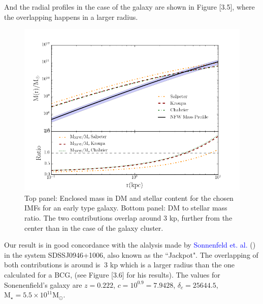 And the radial profiles in the case of the galaxy are shown in Figure [3.5], where the overlapping happens in a larger radius.

\begin{figure}[H]
\centering
\includegraphics[width=12cm]{images/DM_fraction_all_IMFs_galaxy.png}
\caption[DM and Stellar mass profiles for a massive early type galaxy.]{Top panel: Enclosed mass in DM and stellar content for the chosen IMFs for an early type galaxy. Bottom panel: DM to stellar mass ratio. The two contributions overlap around 3 kp, further from the center than in the case of the galaxy cluster.}
\end{figure}

Our result is in good concordance with the alalysis made by \textcolor{blue}{Sonnenfeld et. al.} (\citeyear{Reference15}) in the system SDSSJ0946+1006, also known as the ``Jackpot". The overlapping of both contributions is around is $~3$ kp which is a larger radius than the one calculated for a BCG, (see Figure [3.6] for his results). The values for Sonenenfield's galaxy are $z=0.222$, $c=10^{0.9}=7.9428$, $\delta_c=25644.5$, $\text{M}_{\star}=5.5\times 10^{11} \text{M}_{\odot}$.

